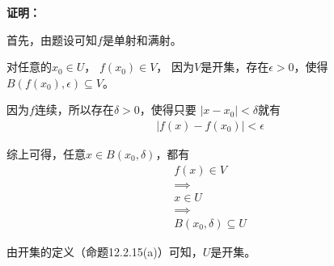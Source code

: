 \documentclass{article}
\begin{document}
\textbf{证明：}

首先，由题设可知$f$是单射和满射。

对任意的$x_0 \in U$，
$f(x_0) \in V$，
因为$V$是开集，存在$\epsilon > 0$，使得$B(f(x_0), \epsilon) \subseteq V$。

因为$f$连续，所以存在$\delta > 0$，使得只要
$|x - x_0| < \delta$就有
\begin{align*}
  |f(x) - f(x_0)| < \epsilon
\end{align*}

综上可得，任意$x \in B(x_0, \delta)$，都有
\begin{align*}
  f(x) \in V \\
  \implies   \\
  x \in U    \\
  \implies   \\
  B(x_0, \delta) \subseteq U
\end{align*}

由开集的定义（命题12.2.15(a)）可知，$U$是开集。
\end{document}
